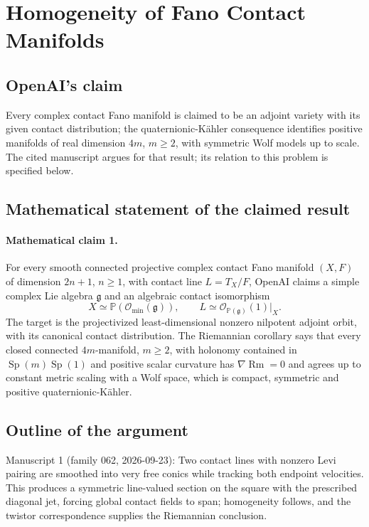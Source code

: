 \documentclass[11pt]{article}
\begin{document}
\section*{Homogeneity of Fano Contact Manifolds}

\subsection{OpenAI's claim}
Every complex contact Fano manifold is claimed to be an adjoint variety with its given contact distribution; the quaternionic-Kähler consequence identifies positive manifolds of real dimension $4m$, $m\ge2$, with symmetric Wolf models up to scale. The cited manuscript argues for that result; its relation to this problem is specified below.

\subsection{Mathematical statement of the claimed result}
\paragraph{Mathematical claim 1.} For every smooth connected projective complex contact Fano manifold $(X,F)$ of dimension $2n+1$, $n\ge1$, with contact line $L=T_X/F$, OpenAI claims a simple complex Lie algebra $\mathfrak g$ and an algebraic contact isomorphism
\[
X\simeq\mathbb P(\mathcal O_{\min}(\mathfrak g)),\qquad
L\simeq\mathcal O_{\mathbb P(\mathfrak g)}(1)|_X.
\]
The target is the projectivized least-dimensional nonzero nilpotent adjoint orbit, with its canonical contact distribution. The Riemannian corollary says that every closed connected $4m$-manifold, $m\ge2$, with holonomy contained in $\operatorname{Sp}(m)\operatorname{Sp}(1)$ and positive scalar curvature has $\nabla\operatorname{Rm}=0$ and agrees up to constant metric scaling with a Wolf space, which is compact, symmetric and positive quaternionic-Kähler.

\subsection{Outline of the argument}
Manuscript 1 (family 062, 2026-09-23): Two contact lines with nonzero Levi pairing are smoothed into very free conics while tracking both endpoint velocities. This produces a symmetric line-valued section on the square with the prescribed diagonal jet, forcing global contact fields to span; homogeneity follows, and the twistor correspondence supplies the Riemannian conclusion.
\end{document}

